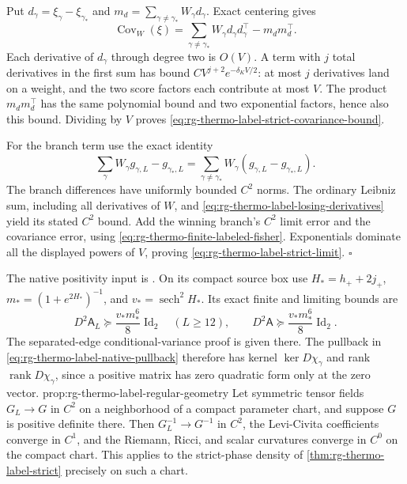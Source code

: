 Put $d_\gamma=\xi_\gamma-\xi_{\gamma_*}$ and
$m_d=\sum_{\gamma\ne\gamma_*}W_\gamma d_\gamma$. Exact centering gives
\begin{equation}
 \operatorname{Cov}_W(\xi)
 =\sum_{\gamma\ne\gamma_*}W_\gamma d_\gamma d_\gamma^\top
                                      -m_dm_d^\top.
 \label{eq:rg-thermo-label-strict-centered-covariance}
\end{equation}
Each derivative of $d_\gamma$ through degree two is $O(V)$. A term
with $j$ total derivatives in the first sum has bound
$CV^{j+2}e^{-\delta_KV/2}$: at most $j$ derivatives land on a weight,
and the two score factors each contribute at most $V$.
The product $m_dm_d^\top$ has the same polynomial bound and two
exponential factors, hence also this bound. Dividing by $V$ proves
\cref{eq:rg-thermo-label-strict-covariance-bound}.

For the branch term use the exact identity
\begin{equation}
 \sum_\gamma W_\gamma g_{\gamma,L}-g_{\gamma_*,L}
 =\sum_{\gamma\ne\gamma_*}W_\gamma
                         (g_{\gamma,L}-g_{\gamma_*,L}).
 \label{eq:rg-thermo-label-strict-branch-error}
\end{equation}
The branch differences have uniformly bounded $C^2$ norms. The ordinary
Leibniz sum, including all derivatives of $W$, and
\cref{eq:rg-thermo-label-losing-derivatives} yield its stated $C^2$
bound. Add the winning branch's $C^2$ limit error and the covariance
error, using \cref{eq:rg-thermo-finite-labeled-fisher}. Exponentials
dominate all the displayed powers of $V$, proving
\cref{eq:rg-thermo-label-strict-limit}. $\square$

The native positivity input is
. On its compact source
box use $H_*=h_++2j_+$, $m_*=(1+e^{2H_*})^{-1}$, and
$v_*=\operatorname{sech}^2H_*$. Its exact finite and limiting bounds are
\begin{equation}
 D^2\mathsf A_L\succeq\frac{v_*m_*^6}{8}\operatorname{Id}_2
       \quad(L\geq12),\qquad
 D^2\mathsf A\succeq\frac{v_*m_*^6}{8}\operatorname{Id}_2.
 \label{eq:rg-thermo-label-native-floor-input}
\end{equation}
The separated-edge conditional-variance proof is given there. The
pullback in \cref{eq:rg-thermo-label-native-pullback} therefore has
kernel $\ker D\chi_\gamma$ and rank $\operatorname{rank}D\chi_\gamma$,
since a positive matrix has zero quadratic form only at the zero vector.\thermoestablishedstatus
{}
{prop:rg-thermo-label-regular-geometry}
Let symmetric tensor fields $G_L\to G$ in $C^2$ on a neighborhood of a
compact parameter chart, and suppose $G$ is positive definite there.
Then $G_L^{-1}\to G^{-1}$ in $C^2$, the Levi-Civita coefficients converge
in $C^1$, and the Riemann, Ricci, and scalar curvatures converge in
$C^0$ on the compact chart. This applies to the strict-phase density
of \cref{thm:rg-thermo-label-strict} precisely on such a chart.\thermoestablishedstatus


